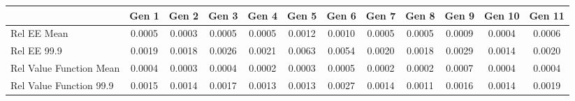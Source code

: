 
\begin{tabular}{@{}lccccccccccc@{}}
\hline
\hline
& Gen 1 & Gen 2 & Gen 3 & Gen 4 & Gen 5 & Gen 6 & Gen 7 & Gen 8 & Gen 9 & Gen 10 & Gen 11 \\
\hline
Rel EE Mean          & 0.0005 & 0.0003 & 0.0005 & 0.0005 & 0.0012 & 0.0010 & 0.0005 & 0.0005 & 0.0009 & 0.0004 & 0.0006 \\
Rel EE 99.9     & 0.0019 & 0.0018 & 0.0026 & 0.0021 & 0.0063 & 0.0054 & 0.0020 & 0.0018 & 0.0029 & 0.0014 & 0.0020 \\
Rel Value Function Mean       & 0.0004 & 0.0003 & 0.0004 & 0.0002 & 0.0003 & 0.0005 & 0.0002 & 0.0002 & 0.0007 & 0.0004 & 0.0004 \\
Rel Value Function 99.9  & 0.0015 & 0.0014 & 0.0017 & 0.0013 & 0.0013 & 0.0027 & 0.0014 & 0.0011 & 0.0016 & 0.0014 & 0.0019 \\
\bottomrule
\end{tabular}